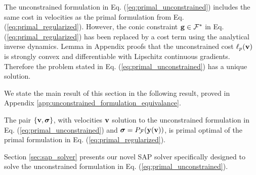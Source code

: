 The unconstrained formulation in Eq. (\ref{eq:primal_unconstrained}) includes
the same cost in velocities as the primal formulation from Eq.
(\ref{eq:primal_regularized}). However, the conic constraint ${\mathbf{g}}\in
\mathcal{F}^*$ in Eq. (\ref{eq:primal_regularized}) has been replaced by a cost
term using the analytical inverse dynamics. Lemma
 in Appendix  proofs
that the unconstrained cost $\ell_p({\mathbf{v}})$ is strongly convex and
differentiable with Lipschitz continuous gradients. Therefore the problem
stated in Eq. (\ref{eq:primal_unconstrained}) has a unique solution.

We state the main result of this section in the following result, proved in
Appendix \ref{app:unconstrained_formulation_equivalance}.
\begin{theorem}
    The pair $\{{\mathbf{v}},{\bm\sigma}\}$, with velocities ${\mathbf{v}}$ solution to the
    unconstrained formulation in Eq. (\ref{eq:primal_unconstrained}) and
    ${\bm\sigma}=P_\mathcal{F}({\mathbf{y}}({\mathbf{v}}))$, is primal optimal of the primal
    formulation in Eq. (\ref{eq:primal_regularized}).
    \label{th:unconstrained_formulation_equivalance}
\end{theorem}

Section \ref{sec:sap_solver} presents our novel SAP solver specifically designed
to solve the unconstrained formulation in Eq. (\ref{eq:primal_unconstrained}).
